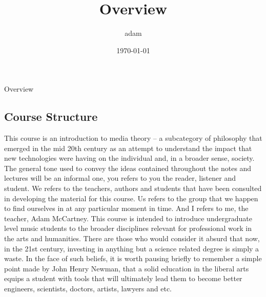 \documentclass[11pt]{article}
\author{adam}
\date{\today}
\title{Overview}
\begin{document}
\maketitle
Overview

\subsection*{Course Structure}
\label{sec:org305ecf6}
This course is an introduction to media theory – a subcategory of
philosophy that emerged in the mid 20th century as an attempt to
understand the impact that new technologies were having on the
individual and, in a broader sense, society.
The general tone used to convey the ideas contained throughout the
notes and lectures will be an informal one, you refers to you the
reader, listener and student. We refers to the teachers, authors and
students that have been consulted in developing the material for this
course. Us refers to the group that we happen to find ourselves in at
any particular moment in time. And I refers to me, the teacher, Adam McCartney.
This course is intended to introduce undergraduate level music
students to the broader disciplines relevant for professional work in
the arts and humanities. There are those who would consider it absurd
that now, in the 21st century, investing in anything but a science
related degree is simply a waste. In the face of such beliefs, it is
worth pausing briefly to remember a simple point made by John Henry
Newman, that a solid education in the liberal arts equips a student
with tools that will ultimately lead them to become better engineers,
scientists, doctors, artists, lawyers and etc.
\end{document}
